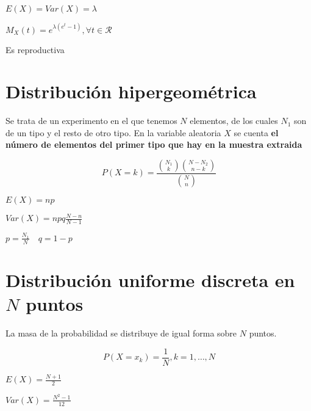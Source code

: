 \begin{itemize*}
\item $E(X)=Var(X)=\lambda $
\item $M_X(t)=e^{\lambda (e^t-1)}, \forall t \in \mathcal{R}$
\item Es reproductiva
\end{itemize*}

\section{Distribución hipergeométrica}

Se trata de un experimento en el que tenemos $N$ elementos, de los cuales
$N_1$ son de un tipo y el resto de otro tipo. En la variable aleatoria $X$
se cuenta \textbf{el número de elementos del primer tipo que hay en la muestra
  extraida}

$$P(X=k)=\frac{{N_1 \choose k}{N-N_2 \choose n-k}}{{N\choose n}}$$

\begin{itemize*}
\item $E(X)=np $
\item $Var(X)=npq\frac{N-n}{N-1}$
  \begin{nota}
    $p=\frac{N_1}{N} \quad q=1-p$
  \end{nota}
\end{itemize*}

\section{Distribución uniforme discreta en $N$ puntos}

La masa de la probabilidad se distribuye de igual forma sobre $N$ puntos.

$$P(X=x_k)=\frac{1}{N},k=1,\dots, N $$

\begin{itemize*}
\item $E(X)= \frac{N+1}{2}$
\item $Var(X)= \frac{N^2-1}{12}$
\end{itemize*}